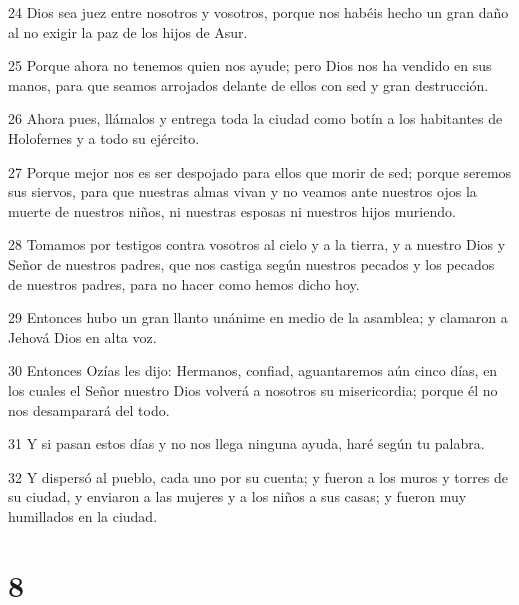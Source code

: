 \par 24 Dios sea juez entre nosotros y vosotros, porque nos habéis hecho un gran daño al no exigir la paz de los hijos de Asur.
\par 25 Porque ahora no tenemos quien nos ayude; pero Dios nos ha vendido en sus manos, para que seamos arrojados delante de ellos con sed y gran destrucción.
\par 26 Ahora pues, llámalos y entrega toda la ciudad como botín a los habitantes de Holofernes y a todo su ejército.
\par 27 Porque mejor nos es ser despojado para ellos que morir de sed; porque seremos sus siervos, para que nuestras almas vivan y no veamos ante nuestros ojos la muerte de nuestros niños, ni nuestras esposas ni nuestros hijos muriendo.
\par 28 Tomamos por testigos contra vosotros al cielo y a la tierra, y a nuestro Dios y Señor de nuestros padres, que nos castiga según nuestros pecados y los pecados de nuestros padres, para no hacer como hemos dicho hoy.
\par 29 Entonces hubo un gran llanto unánime en medio de la asamblea; y clamaron a Jehová Dios en alta voz.
\par 30 Entonces Ozías les dijo: Hermanos, confiad, aguantaremos aún cinco días, en los cuales el Señor nuestro Dios volverá a nosotros su misericordia; porque él no nos desamparará del todo.
\par 31 Y si pasan estos días y no nos llega ninguna ayuda, haré según tu palabra.
\par 32 Y dispersó al pueblo, cada uno por su cuenta; y fueron a los muros y torres de su ciudad, y enviaron a las mujeres y a los niños a sus casas; y fueron muy humillados en la ciudad.

\chapter{8}

